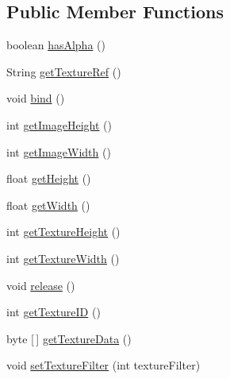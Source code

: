 \subsection*{Public Member Functions}
\begin{DoxyCompactItemize}
\item 
boolean \mbox{\hyperlink{interfaceorg_1_1newdawn_1_1slick_1_1opengl_1_1_texture_a230a2e79b666be14738b585028fbe004}{has\+Alpha}} ()
\item 
String \mbox{\hyperlink{interfaceorg_1_1newdawn_1_1slick_1_1opengl_1_1_texture_a3082bf984c663ac388b9f5d1dc0d0074}{get\+Texture\+Ref}} ()
\item 
void \mbox{\hyperlink{interfaceorg_1_1newdawn_1_1slick_1_1opengl_1_1_texture_a97c02b82a8170c4c0bccb570dc872873}{bind}} ()
\item 
int \mbox{\hyperlink{interfaceorg_1_1newdawn_1_1slick_1_1opengl_1_1_texture_afe73affbe5e20e047f6364ce7b61d7d2}{get\+Image\+Height}} ()
\item 
int \mbox{\hyperlink{interfaceorg_1_1newdawn_1_1slick_1_1opengl_1_1_texture_a7dadcef354aaed97a0fe03f1978ee5f8}{get\+Image\+Width}} ()
\item 
float \mbox{\hyperlink{interfaceorg_1_1newdawn_1_1slick_1_1opengl_1_1_texture_a5a31b691118b19d5fa0bc605fa458ccd}{get\+Height}} ()
\item 
float \mbox{\hyperlink{interfaceorg_1_1newdawn_1_1slick_1_1opengl_1_1_texture_a9a4e474e98451e2fe3cf5bedc8fc5910}{get\+Width}} ()
\item 
int \mbox{\hyperlink{interfaceorg_1_1newdawn_1_1slick_1_1opengl_1_1_texture_a6626d0905e80214b320fb0042ad0e98d}{get\+Texture\+Height}} ()
\item 
int \mbox{\hyperlink{interfaceorg_1_1newdawn_1_1slick_1_1opengl_1_1_texture_aa85f8503feafc2f18472a4deb2a67b4e}{get\+Texture\+Width}} ()
\item 
void \mbox{\hyperlink{interfaceorg_1_1newdawn_1_1slick_1_1opengl_1_1_texture_a57d72d7a615be1b481410739479989a6}{release}} ()
\item 
int \mbox{\hyperlink{interfaceorg_1_1newdawn_1_1slick_1_1opengl_1_1_texture_a0d846c1cfcc66768db002d4eb06ad841}{get\+Texture\+ID}} ()
\item 
byte \mbox{[}$\,$\mbox{]} \mbox{\hyperlink{interfaceorg_1_1newdawn_1_1slick_1_1opengl_1_1_texture_a84c7714d8bdd0e4a933a95ae33531ad7}{get\+Texture\+Data}} ()
\item 
void \mbox{\hyperlink{interfaceorg_1_1newdawn_1_1slick_1_1opengl_1_1_texture_ad55f0e2e39587c24e3e1b149ac8b16db}{set\+Texture\+Filter}} (int texture\+Filter)
\end{DoxyCompactItemize}


